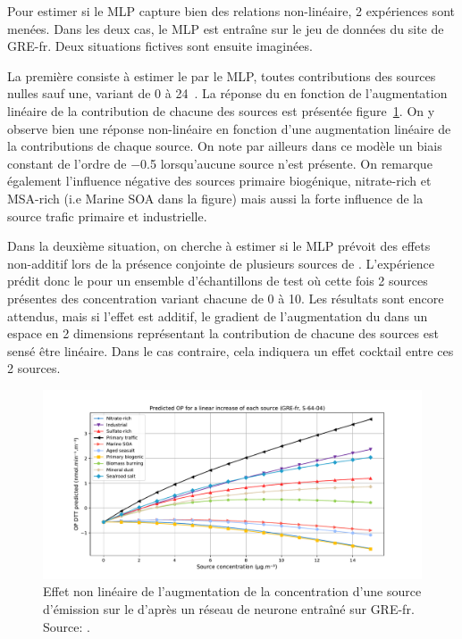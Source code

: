 Pour estimer si le MLP capture bien des relations non-linéaire, 2 expériences sont menées.
Dans les deux cas, le MLP est entraîne sur le jeu de données du site de GRE-fr. Deux
situations fictives sont ensuite imaginées.

La première consiste à estimer le \PODTTv{} par le MLP, toutes contributions des sources
nulles sauf une, variant de 0 à 24~\si{\ugm}. La réponse du \PODTTv{} en fonction de
l'augmentation linéaire de la contribution de chacune des sources est présentée
figure~\ref{fig:figures/chapter05/10sourcesLinearite}. On y observe bien une réponse
non-linéaire en fonction d'une augmentation linéaire de la contributions de
chaque source. On note par ailleurs dans ce modèle un biais constant de l'ordre de
\SI{-0.5}{\opv} lorsqu'aucune source n'est présente.
On remarque également l'influence négative des sources primaire biogénique, nitrate-rich
et MSA-rich (i.e Marine SOA dans la figure) mais aussi la forte influence de la source
trafic primaire et industrielle.

Dans la deuxième situation, on cherche à estimer si le MLP prévoit des effets non-additif
lors de la présence conjointe de plusieurs sources de \PMdix. L'expérience prédit donc le
\PODTTv{} pour un ensemble d'échantillons de test où cette fois 2 sources présentes des
concentration variant chacune de 0 à \SI{10}{\ugm}. Les résultats sont encore attendus,
mais si l'effet est additif, le gradient de l'augmentation du \PODTTv{} dans un espace en
2 dimensions représentant la contribution de chacune des sources est sensé être linéaire.
Dans le cas contraire, cela indiquera un effet cocktail entre ces 2 sources.

\begin{figure}[ht]
    \centering
    \includegraphics[width=0.8\linewidth]{figures/chapter05/prediction_other_0_softplus-64-0.4.pdf}
    \caption{Effet non linéaire de l'augmentation de la concentration d'une source
        d'émission sur le \PODTTv{} d'après un réseau de neurone entraîné sur GRE-fr. Source: \cite{fichesMachine2020}.}%
    \label{fig:figures/chapter05/10sourcesLinearite}
\end{figure}

